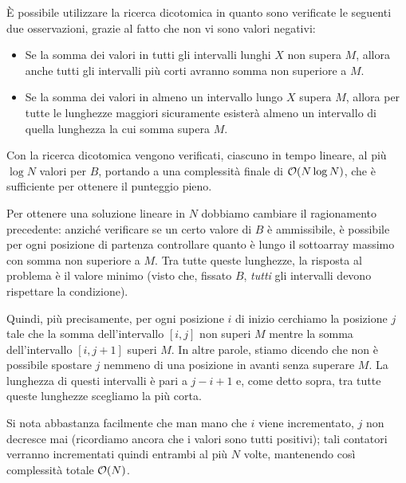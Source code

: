 \begin{solution}
È possibile utilizzare la ricerca dicotomica in quanto sono verificate le seguenti due osservazioni, grazie al fatto che non vi sono valori negativi:
\begin{itemize}[nolistsep, itemsep=2mm]
    \item Se la somma dei valori in tutti gli intervalli lunghi $X$ non supera $M$, allora anche tutti gli intervalli più corti avranno somma non superiore a $M$.
    \item Se la somma dei valori in almeno un intervallo lungo $X$ supera $M$, allora per tutte le lunghezze maggiori sicuramente esisterà almeno un intervallo di quella lunghezza la cui somma supera $M$.
\end{itemize}
Con la ricerca dicotomica vengono verificati, ciascuno in tempo lineare, al più $\log N$ valori per $B$, portando a una complessità finale di $\mathcal{O}(N \log N)$, che è sufficiente per ottenere il punteggio pieno.

\Sol
Per ottenere una soluzione lineare in $N$ dobbiamo cambiare il ragionamento precedente: anziché verificare se un certo valore di $B$ è ammissibile, è possibile per ogni posizione di partenza controllare quanto è lungo il sottoarray massimo con somma non superiore a $M$. Tra tutte queste lunghezze, la risposta al problema è il valore minimo (visto che, fissato $B$, \emph{tutti} gli intervalli devono rispettare la condizione).

Quindi, più precisamente, per ogni posizione $i$ di inizio cerchiamo la posizione $j$ tale che la somma dell'intervallo $[i,j]$ non superi $M$ mentre la somma dell'intervallo $[i, j+1]$ superi $M$. In altre parole, stiamo dicendo che non è possibile spostare $j$ nemmeno di una posizione in avanti senza superare $M$. La lunghezza di questi intervalli è pari a $j-i+1$ e, come detto sopra, tra tutte queste lunghezze scegliamo la più corta.

Si nota abbastanza facilmente che man mano che $i$ viene incrementato, $j$ non decresce mai (ricordiamo ancora che i valori sono tutti positivi); tali contatori verranno incrementati quindi entrambi al più $N$ volte, mantenendo così complessità totale $\mathcal{O}(N)$.

\Cppsol
\colorbox{white}{}

\end{solution}
